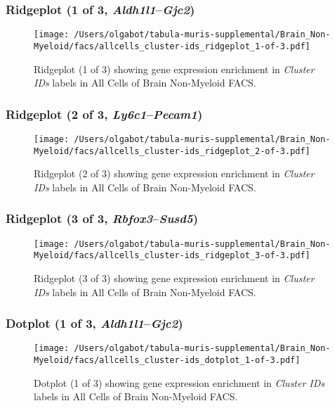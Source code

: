 \clearpage

\subsubsection{Ridgeplot (1 of 3, \emph{Aldh1l1}--\emph{Gjc2})}
\begin{figure}[h]
\centering
\texttt{[image: /Users/olgabot/tabula-muris-supplemental/Brain\_Non-Myeloid/facs/allcells\_cluster-ids\_ridgeplot\_1-of-3.pdf]}

\caption{ Ridgeplot (1 of 3)  showing gene expression enrichment in \emph{Cluster IDs} labels in All Cells of Brain Non-Myeloid FACS. }
\end{figure}


\clearpage

\subsubsection{Ridgeplot (2 of 3, \emph{Ly6c1}--\emph{Pecam1})}
\begin{figure}[h]
\centering
\texttt{[image: /Users/olgabot/tabula-muris-supplemental/Brain\_Non-Myeloid/facs/allcells\_cluster-ids\_ridgeplot\_2-of-3.pdf]}

\caption{ Ridgeplot (2 of 3)  showing gene expression enrichment in \emph{Cluster IDs} labels in All Cells of Brain Non-Myeloid FACS. }
\end{figure}


\clearpage

\subsubsection{Ridgeplot (3 of 3, \emph{Rbfox3}--\emph{Susd5})}
\begin{figure}[h]
\centering
\texttt{[image: /Users/olgabot/tabula-muris-supplemental/Brain\_Non-Myeloid/facs/allcells\_cluster-ids\_ridgeplot\_3-of-3.pdf]}

\caption{ Ridgeplot (3 of 3)  showing gene expression enrichment in \emph{Cluster IDs} labels in All Cells of Brain Non-Myeloid FACS. }
\end{figure}


\clearpage

\subsubsection{Dotplot (1 of 3, \emph{Aldh1l1}--\emph{Gjc2})}
\begin{figure}[h]
\centering
\texttt{[image: /Users/olgabot/tabula-muris-supplemental/Brain\_Non-Myeloid/facs/allcells\_cluster-ids\_dotplot\_1-of-3.pdf]}

\caption{ Dotplot (1 of 3)  showing gene expression enrichment in \emph{Cluster IDs} labels in All Cells of Brain Non-Myeloid FACS. }
\end{figure}


